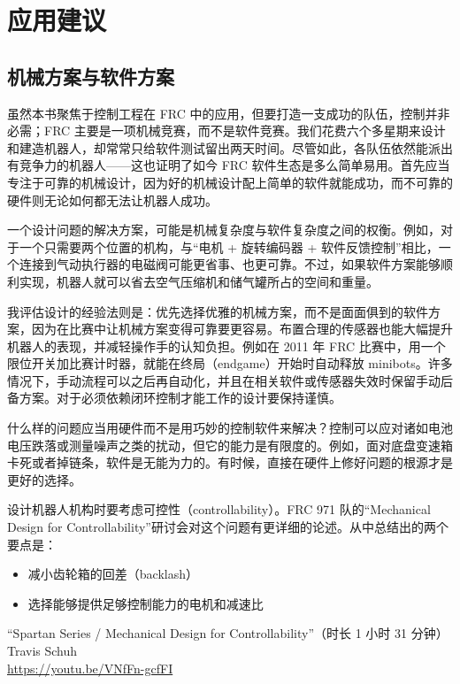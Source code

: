 ﻿
\chapter{应用建议}

\section{机械方案与软件方案}
\label{sec:mechvssw}

虽然本书聚焦于控制工程在 FRC 中的应用，但要打造一支成功的队伍，控制并非必需；FRC 主要是一项机械竞赛，而不是软件竞赛。我们花费六个多星期来设计和建造机器人，却常常只给软件测试留出两天时间。尽管如此，各队伍依然能派出有竞争力的机器人——这也证明了如今 FRC 软件生态是多么简单易用。首先应当专注于可靠的机械设计，因为好的机械设计配上简单的软件就能成功，而不可靠的硬件则无论如何都无法让机器人成功。

一个设计问题的解决方案，可能是机械复杂度与软件复杂度之间的权衡。例如，对于一个只需要两个位置的机构，与``电机 + 旋转编码器 + 软件反馈控制''相比，一个连接到气动执行器的电磁阀可能更省事、也更可靠。不过，如果软件方案能够顺利实现，机器人就可以省去空气压缩机和储气罐所占的空间和重量。

我评估设计的经验法则是：优先选择优雅的机械方案，而不是面面俱到的软件方案，因为在比赛中让机械方案变得可靠要更容易。布置合理的传感器也能大幅提升机器人的表现，并减轻操作手的认知负担。例如在 2011 年 FRC 比赛中，用一个限位开关加比赛计时器，就能在终局（endgame）开始时自动释放 minibots。许多情况下，手动流程可以之后再自动化，并且在相关软件或传感器失效时保留手动后备方案。对于必须依赖闭环控制才能工作的设计要保持谨慎。

什么样的问题应当用硬件而不是用巧妙的控制软件来解决？控制可以应对诸如电池电压跌落或测量噪声之类的扰动，但它的能力是有限度的。例如，面对底盘变速箱卡死或者掉链条，软件是无能为力的。有时候，直接在硬件上修好问题的根源才是更好的选择。

设计机器人机构时要考虑可控性（controllability）。FRC 971 队的``Mechanical Design for Controllability''研讨会对这个问题有更详细的论述。从中总结出的两个要点是：

\begin{itemize}
  \item 减小齿轮箱的回差（backlash）
  \item 选择能够提供足够控制能力的电机和减速比
\end{itemize}

\begin{media}[视频资源]
``Spartan Series / Mechanical Design for Controllability''（时长 1 小时 31 分钟）\\
Travis Schuh\\
\url{https://youtu.be/VNfFn-gcfFI}
\end{media}

